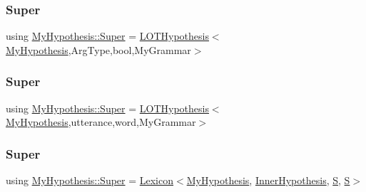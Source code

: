 \mbox{\label{class_my_hypothesis_a12e3d952f8fca502912d3bd868fa9f99}} 
\subsubsection{\texorpdfstring{Super}{Super}\hspace{0.1cm}{\footnotesize\ttfamily [4/6]}}
{\footnotesize\ttfamily using \hyperlink{class_my_hypothesis_a12e3d952f8fca502912d3bd868fa9f99}{My\+Hypothesis\+::\+Super} =  \hyperlink{class_l_o_t_hypothesis}{L\+O\+T\+Hypothesis}$<$\hyperlink{class_my_hypothesis}{My\+Hypothesis},Arg\+Type,bool,My\+Grammar$>$}

\mbox{\label{class_my_hypothesis_a1c1cfa95f1a49b273f8a93b3246342e6}} 
\subsubsection{\texorpdfstring{Super}{Super}\hspace{0.1cm}{\footnotesize\ttfamily [5/6]}}
{\footnotesize\ttfamily using \hyperlink{class_my_hypothesis_a12e3d952f8fca502912d3bd868fa9f99}{My\+Hypothesis\+::\+Super} =  \hyperlink{class_l_o_t_hypothesis}{L\+O\+T\+Hypothesis}$<$\hyperlink{class_my_hypothesis}{My\+Hypothesis},utterance,word,My\+Grammar$>$}

\mbox{\label{class_my_hypothesis_a266742f266abc638ddc1d1870d735313}} 
\subsubsection{\texorpdfstring{Super}{Super}\hspace{0.1cm}{\footnotesize\ttfamily [6/6]}}
{\footnotesize\ttfamily using \hyperlink{class_my_hypothesis_a12e3d952f8fca502912d3bd868fa9f99}{My\+Hypothesis\+::\+Super} =  \hyperlink{class_lexicon}{Lexicon}$<$\hyperlink{class_my_hypothesis}{My\+Hypothesis}, \hyperlink{class_inner_hypothesis}{Inner\+Hypothesis}, \hyperlink{_models_2_formal_language_theory-_complex_2_main_8cpp_a51c40915539205f0b5add30b0d68a4cb}{S}, \hyperlink{_models_2_formal_language_theory-_complex_2_main_8cpp_a51c40915539205f0b5add30b0d68a4cb}{S}$>$}



